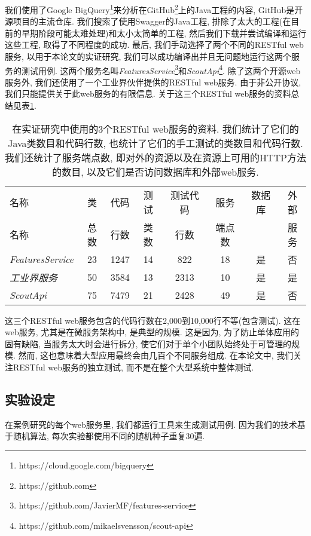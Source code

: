         我们使用了Google BigQuery\footnote{https://cloud.google.com/bigquery}来分析在GitHub\footnote{https://github.com}上的Java工程的内容, GitHub是开源项目的主流仓库. 我们搜索了使用Swagger的Java工程, 排除了太大的工程(在目前的早期阶段可能太难处理)和太小太简单的工程, 然后我们下载并尝试编译和运行这些工程, 取得了不同程度的成功. 最后, 我们手动选择了两个不同的RESTful web服务, 以用于本论文的实证研究, 我们可以成功编译出并且无问题地运行这两个服务的测试用例. 这两个服务名叫\textit{FeaturesService}\footnote{https://github.com/JavierMF/features-service}和\textit{ScoutApi}\footnote{https://github.com/mikaelsvensson/scout-api}. 除了这两个开源web服务外, 我们还使用了一个工业界伙伴提供的RESTful web服务. 由于非公开协议, 我们只能提供关于此web服务的有限信息. 关于这三个RESTful web服务的资料总结见表\ref{table1}. 
        
  \begin{table}
      \small
      \centering
      \begin{tabular}{lccccccc}
          \toprule
            名称 & 类 & 代码 & 测试 & 测试代码 & 服务 & 数据库 & 外部 \\
            名称 & 总数 & 行数 & 类数 & 行数 & 端点数 &  & 服务 \\
            \midrule
            \textit{FeaturesService} & 23 & 1247 & 14 & 822 & 18 & 是 & 否 \\
            \textit{工业界服务} & 50 & 3584 & 13 & 2313 & 10 & 是 & 是 \\
            \textit{ScoutApi} & 75 & 7479 & 21 & 2428 & 49 & 是 & 否 \\
            \bottomrule
        \end{tabular}
        \caption{在实证研究中使用的3个RESTful web服务的资料. 我们统计了它们的Java类数目和代码行数, 也统计了它们的手工测试的类数目和代码行数. 我们还统计了服务端点数, 即对外的资源以及在资源上可用的HTTP方法的数目, 以及它们是否访问数据库和外部web服务.}
        \label{table1}
    \end{table}

        这三个RESTful web服务包含的代码行数在2,000到10,000行不等(包含测试). 这在web服务, 尤其是在微服务架构中, 是典型的规模\cite{newman2015building}. 这是因为, 为了防止单体应用的固有缺陷, 当服务太大时会进行拆分, 使它们对于单个小团队始终处于可管理的规模. 然而, 这也意味着大型应用最终会由几百个不同服务组成. 在本论文中, 我们关注RESTful web服务的独立测试, 而不是在整个大型系统中整体测试. 
    
    \subsection{实验设定}
      在案例研究的每个web服务里, 我们都运行工具来生成测试用例. 因为我们的技术基于随机算法, 每次实验都使用不同的随机种子重复30遍. 
        
